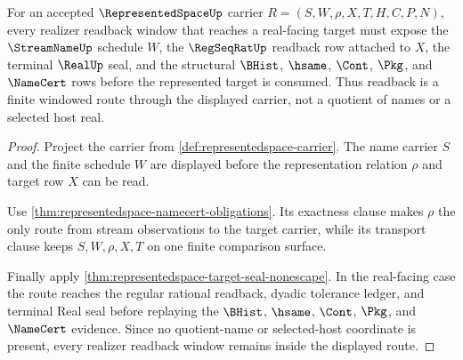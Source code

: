 \begin{theorem}
\label{thm:representedspace-realizer-readback-window}
For an accepted $\RepresentedSpaceUp$ carrier $R=(S,W,\rho,X,T,H,C,P,N)$, every realizer readback window that reaches a real-facing target must expose the $\StreamNameUp$ schedule $W$, the $\RegSeqRatUp$ readback row attached to $X$, the terminal $\RealUp$ seal, and the structural $\BHist$, $\hsame$, $\Cont$, $\Pkg$, and $\NameCert$ rows before the represented target is consumed. Thus readback is a finite windowed route through the displayed carrier, not a quotient of names or a selected host real.
\end{theorem}
\begin{proof}
Project the carrier from \autoref{def:representedspace-carrier}. The name carrier $S$ and the finite schedule $W$ are displayed before the representation relation $\rho$ and target row $X$ can be read.

Use \autoref{thm:representedspace-namecert-obligations}. Its exactness clause makes $\rho$ the only route from stream observations to the target carrier, while its transport clause keeps $S,W,\rho,X,T$ on one finite comparison surface.

Finally apply \autoref{thm:representedspace-target-seal-nonescape}. In the real-facing case the route reaches the regular rational readback, dyadic tolerance ledger, and terminal Real seal before replaying the $\BHist$, $\hsame$, $\Cont$, $\Pkg$, and $\NameCert$ evidence. Since no quotient-name or selected-host coordinate is present, every realizer readback window remains inside the displayed route.
\end{proof}

